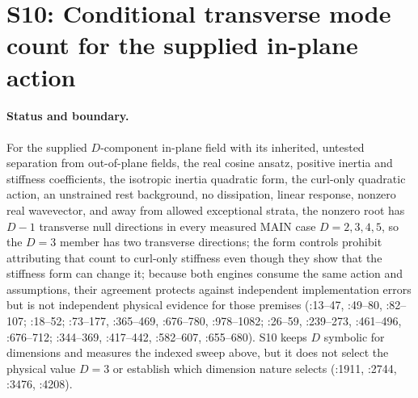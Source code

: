 \section{S10: Conditional transverse mode count for the supplied in-plane
action}\label{step:S10}


\paragraph{Status and boundary.}
For the supplied \(D\)-component in-plane field with its inherited, untested
separation from out-of-plane fields, the real cosine ansatz, positive inertia
and stiffness coefficients, the isotropic inertia quadratic form, the curl-only
quadratic action, an unstrained rest background, no dissipation, linear
response, nonzero real wavevector, and away from allowed exceptional strata,
the nonzero root has
\(D-1\) transverse null directions in every measured MAIN case \(D=2,3,4,5\),
so the \(D=3\) member has two transverse directions; the form controls prohibit
attributing that count to curl-only stiffness even though they show that the
stiffness form can change it; because both engines consume the same action and
assumptions, their agreement protects against independent implementation errors
but is not independent physical evidence for those premises
(:13--47,
:49--80, :82--107;
:18--52;
:73--177,
:365--469, :676--780, :978--1082;
:26--59,
:239--273, :461--496, :676--712;
:344--369,
:417--442, :582--607, :655--680).
S10 keeps \(D\) symbolic for dimensions and measures the indexed sweep above,
but it does not select the physical value \(D=3\) or establish which dimension
nature selects (:1911,
:2744, :3476, :4208).

